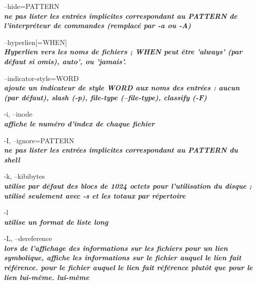 \documentclass{article}
\begin{document}
              
       \par--hide=PATTERN\\
              \textit{\textbf{ne pas lister les entrées implicites correspondant au PATTERN de l'interpréteur de commandes (remplacé
              par -a ou -A)}}\\
\par--hyperlien[=WHEN]\\
              \textit{\textbf{Hyperlien vers les noms de fichiers ; WHEN peut être 'always' (par défaut si omis),
              auto', ou 'jamais'.}}\\

       \par--indicator-style=WORD\\
               \textit{\textbf{ajoute un indicateur de style WORD aux noms des entrées : aucun (par défaut),
              slash (-p), file-type (--file-type), classify (-F)}}\\
   
       \par -i, --inode\\
              \textit{\textbf{ affiche le numéro d'index de chaque fichier}}\\

        \par-I, --ignore=PATTERN\\
               \textit{\textbf{ne pas lister les entrées implicites correspondant au PATTERN du shell}}\\

       \par-k, --kibibytes\\
              \textit{\textbf{ utilise par défaut des blocs de 1024 octets pour l'utilisation du disque ; utilisé seulement avec -s
              et les totaux par répertoire}}\\

      \par -l \\   \textit{\textbf{ utilise un format de liste long}}\\

      \par -L, --dereference\\  
             \textit{\textbf{ lors de l'affichage des informations sur les fichiers pour un lien symbolique, affiche les informations sur le fichier auquel le lien fait référence.
              pour le fichier auquel le lien fait référence plutôt que pour le lien lui-même.
              lui-même}}\\
\end{document}
